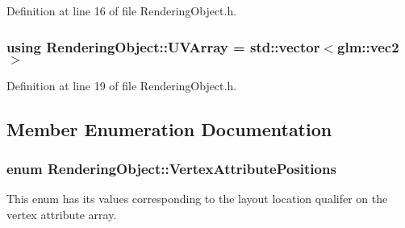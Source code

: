 Definition at line 16 of file Rendering\+Object.\+h.

\hypertarget{class_rendering_object_a504ecd45ebe36dfa5b78c46d64d9904a}{}
\subsubsection[{U\+V\+Array}]{\setlength{\rightskip}{0pt plus 5cm}using {\bf Rendering\+Object\+::\+U\+V\+Array} =  std\+::vector$<$glm\+::vec2$>$}\label{class_rendering_object_a504ecd45ebe36dfa5b78c46d64d9904a}


Definition at line 19 of file Rendering\+Object.\+h.



\subsection{Member Enumeration Documentation}
\hypertarget{class_rendering_object_ab772f569ef63a1db07db29a744b519ee}{}
\subsubsection[{Vertex\+Attribute\+Positions}]{\setlength{\rightskip}{0pt plus 5cm}enum {\bf Rendering\+Object\+::\+Vertex\+Attribute\+Positions}\hspace{0.3cm}{\ttfamily [strong]}}\label{class_rendering_object_ab772f569ef63a1db07db29a744b519ee}


This enum has its values corresponding to the layout location qualifer on the vertex attribute array. 

